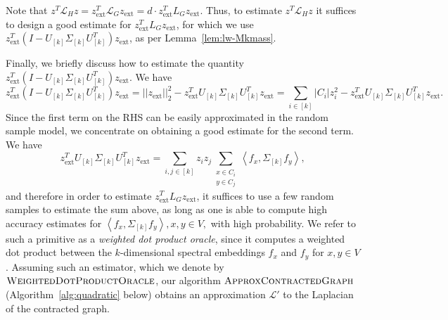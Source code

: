 \documentclass[letterpaper,11pt]{article}
\newcommand{\zext}{z_{\text{ext}}}
\theoremstyle{plain}
\theoremstyle{definition}
\theoremstyle{remark}
\newcommand{\rdp}[1]
  {\ensuremath{\left\langle #1 \right\rangle}}
\begin{document}
Note that $z^T \mathcal{L}_H z = \zext^T \mathcal{L}_G \zext = d\cdot \zext^T L_G \zext.$ 
Thus, to estimate $z^T \mathcal{L}_H z$ it suffices to design a good estimate for $\zext^T L_G \zext$, for which we use $\zext^T(I - U_{[k]}\Sigma_{[k]} U_{[k]}^T)\zext$, as per Lemma~\ref{lem:lw-Mkmass}. 

Finally, we briefly discuss how to estimate the quantity $\zext^T(I - U_{[k]}\Sigma_{[k]} U_{[k]}^T)\zext$. We have
$$
\zext^T(I - U_{[k]}\Sigma_{[k]} U_{[k]}^T)\zext=||\zext||_2^2- \zext^TU_{[k]}\Sigma_{[k]} U_{[k]}^T\zext= \sum_{i\in [k]} |C_i| z_i^2- \zext^TU_{[k]}\Sigma_{[k]} U_{[k]}^T\zext.
$$
Since the first term on the RHS can be easily approximated in the random sample model, we concentrate on obtaining a good estimate for the second term. We have
\begin{equation}
	\zext^T U_{[k]} \Sigma_{[k]} U_{[k]}^T \zext = \sum_{i,j \in [k]} z_i z_j \sum_{\substack{x \in C_i\\y \in C_j}} \rdp{f_x, \Sigma_{[k]} f_y},
\end{equation}
and therefore in order to estimate $\zext^T  L_G \zext$, it suffices to use a few random samples to estimate the sum above, as long as one is able to compute high accuracy estimates for  $\rdp{f_x, \Sigma_{[k]} f_y}, x, y\in V,$ with high probability. We refer to such a primitive as a {\em weighted dot product oracle}, since it computes a weighted dot product between the $k$-dimensional spectral embeddings $f_x$ 
 and $f_y$ for $x,y\in V$. Assuming such an estimator, which we denote by $\textsc{WeightedDotProductOracle}$, our algorithm $\textsc{ApproxContractedGraph}$ (Algorithm~\ref{alg:quadratic} below) obtains an approximation $\mathcal{L}'$ to the Laplacian of the contracted graph.  \\
\vspace{-10pt}
\end{document}
